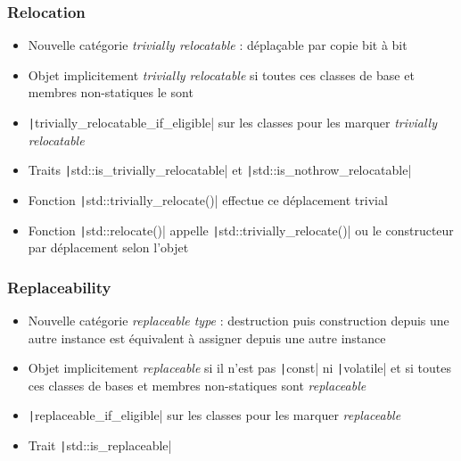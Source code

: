 \documentclass[C++.tex]{subfiles}
\begin{document}
\begin{frame}[fragile]
	\frametitle{Relocation}
	\begin{itemize}
		\item Nouvelle catégorie \textit{trivially relocatable} : déplaçable par copie bit à bit


		\item Objet implicitement \textit{trivially relocatable} si toutes ces classes de base et membres non-statiques le sont
		\item \texttt|trivially_relocatable_if_eligible| sur les classes pour les marquer \textit{trivially relocatable}
		\item Traits \texttt|std::is_trivially_relocatable| et \texttt|std::is_nothrow_relocatable|
		\item Fonction \texttt|std::trivially_relocate()| effectue ce déplacement trivial
		\item Fonction \texttt|std::relocate()| appelle \texttt|std::trivially_relocate()| ou le constructeur par déplacement selon l'objet
	\end{itemize}

\end{frame}

\begin{frame}[fragile]
	\frametitle{Replaceability}
	\begin{itemize}
		\item Nouvelle catégorie \textit{replaceable type} : destruction puis construction depuis une autre instance est équivalent à assigner depuis une autre instance
		\item Objet implicitement \textit{replaceable} si il n'est pas \texttt|const| ni \texttt|volatile| et si toutes ces classes de bases et membres non-statiques sont \textit{replaceable}


		\item \texttt|replaceable_if_eligible| sur les classes pour les marquer \textit{replaceable}
		\item Trait \texttt|std::is_replaceable|
	\end{itemize}

\end{frame}
\end{document}
